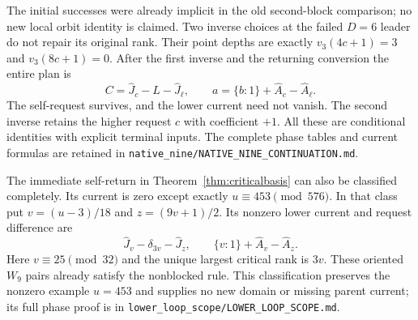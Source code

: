 \documentclass[11pt]{article}
\begin{document}
The initial successes were already implicit in the old second-block
comparison; no new local orbit identity is claimed. Two inverse choices
at the failed $D=6$ leader do not repair its original rank.
Their point depths are exactly $v_3(4c+1)=3$ and $v_3(8c+1)=0$.
After the first inverse and the returning conversion the entire plan is
\[
 C=\widehat J_c-L-\widehat J_\ell,\qquad
 a=\{b:1\}+\widehat A_c-\widehat A_\ell.
\]
The self-request survives, and the lower current need not vanish.
The second inverse retains the higher request $c$ with coefficient $+1$.
All these are conditional identities with explicit terminal inputs.
The complete phase tables and current formulas are retained in
\texttt{native\_nine/NATIVE\_NINE\_CONTINUATION.md}.

The immediate self-return in Theorem~\ref{thm:criticalbasis} can also
be classified completely. Its current is zero except exactly
$u\equiv453\pmod{576}$. In that class put $v=(u-3)/18$ and
$z=(9v+1)/2$. Its nonzero lower current and request difference are
\[
 \widehat J_v-\delta_{3v}-\widehat J_z,
 \qquad\{v:1\}+\widehat A_v-\widehat A_z.
\]
Here $v\equiv25\pmod{32}$ and the unique largest critical rank is
$3v$. These oriented $W_9$ pairs already satisfy the nonblocked rule.
This classification preserves the nonzero example $u=453$ and supplies
no new domain or missing parent current; its full phase proof is in
\texttt{lower\_loop\_scope/LOWER\_LOOP\_SCOPE.md}.
\end{document}

